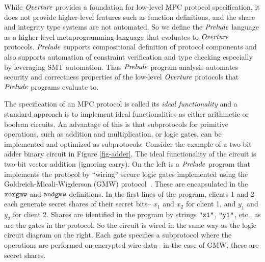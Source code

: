 While $\mathit{Overture}$ provides a foundation for low-level MPC protocol
specification, it does not provide higher-level features such as
function definitions, and the share and integrity type systems are not
automated. So we define the $\mathit{Prelude}$ language as a higher-level
metaprogramming language that evaluates to $\mathit{Overture}$ protocols.
$\mathit{Prelude}$ supports compositional definition of protocol components
and also supports automation of constraint verification and type
checking especially by leveraging SMT automation.  Thus $\mathit{Prelude}$
program analysis automates security and correctness properties of the
low-level $\mathit{Overture}$ protocols that $\mathit{Prelude}$ programs evaluate to.

The specification of an MPC protocol is called its \emph{ideal
functionality} and a standard approach \cite{269581} is to implement
ideal functionalities as either arithmetic or boolean circuits. An
advantage of this is that subprotocols for primitive operations, such
as addition and multiplication, or logic gates, can be implemented and
optimized as subprotocols. Consider the example of a two-bit adder
binary circuit in Figure \ref{fig-adder}. The ideal functionality of
the circuit is two-bit vector addition (ignoring carry). On the left
is a $\mathit{Prelude}$ program that implements the protocol by ``wiring''
secure logic gates implemented using the Goldreich-Micali-Wigderson
(GMW) protocol~\cite{goldreich1987play}. These are encapsulated in the $\texttt{xorgmw}$ and
$\texttt{andgmw}$ definitions. In the first lines of the program, clients
1 and 2 each generate secret shares of their secret bits-- $x_1$ and
$x_2$ for client 1, and $y_1$ and $y_2$ for client 2. Shares are
identified in the program by strings $\texttt{"x1"}$, $\texttt{"y1"}$, etc.,
as are the gates in the protocol. So the circuit is wired in the
same way as the logic circuit diagram on the right. Each gate
specifies a subprotocol where the operations are performed on
encrypted wire data-- in the case of GMW, these are secret shares. 


